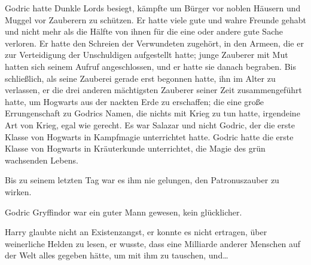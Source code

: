 Godric hatte Dunkle Lords besiegt, kämpfte um Bürger vor noblen Häusern und Muggel vor Zauberern zu schützen. Er hatte viele gute und wahre Freunde gehabt und nicht mehr als die Hälfte von ihnen für die eine oder andere gute Sache verloren. Er hatte den Schreien der Verwundeten zugehört, in den Armeen, die er zur Verteidigung der Unschuldigen aufgestellt hatte; junge Zauberer mit Mut hatten sich seinem Aufruf angeschlossen, und er hatte sie danach begraben. Bis schließlich, als seine Zauberei gerade erst begonnen hatte, ihn im Alter zu verlassen, er die drei anderen mächtigsten Zauberer seiner Zeit zusammengeführt hatte, um Hogwarts aus der nackten Erde zu erschaffen; die eine große Errungenschaft zu Godrics Namen, die nichts mit Krieg zu tun hatte, irgendeine Art von Krieg, egal wie gerecht. Es war Salazar und nicht Godric, der die erste Klasse von Hogwarts in Kampfmagie unterrichtet hatte. Godric hatte die erste Klasse von Hogwarts in Kräuterkunde unterrichtet, die Magie des grün wachsenden Lebens.

Bis zu seinem letzten Tag war es ihm nie gelungen, den Patronuszauber zu wirken.

Godric Gryffindor war ein guter Mann gewesen, kein glücklicher.

Harry glaubte nicht an Existenzangst, er konnte es nicht ertragen, über weinerliche Helden zu lesen, er wusste, dass eine Milliarde anderer Menschen auf der Welt alles gegeben hätte, um mit ihm zu tauschen, und…

